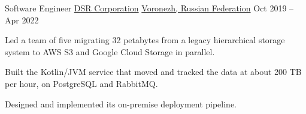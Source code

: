 \begin{cventries}
	\cventry
	{Software Engineer}
	{\href{https://www.linkedin.com/company/dsr-corporation/}{DSR Corporation}}
	{\href{https://www.google.com/maps/place/Voronezh,+Voronezh+Oblast,+Russia}{Voronezh, Russian Federation}}
	{Oct 2019 -- Apr 2022}
	{
		\begin{cvitems}
			\item {Led a team of five migrating 32 petabytes from a legacy hierarchical storage system to AWS S3 and Google Cloud Storage in parallel.}
			\item {Built the Kotlin/JVM service that moved and tracked the data at about 200 TB per hour, on PostgreSQL and RabbitMQ.}
			\item {Designed and implemented its on-premise deployment pipeline.}
		\end{cvitems}
	}

\end{cventries}
